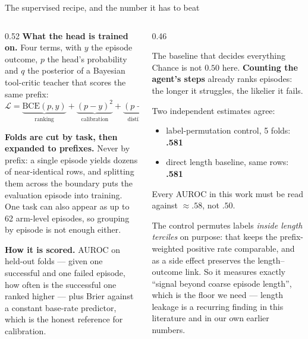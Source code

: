 \documentclass[10pt, aspectratio=169]{beamer}
\newcommand{\g}[1]{\textcolor{accent2}{\textbf{#1}}}
\newcommand{\bad}[1]{\textcolor{warn}{#1}}
\begin{document}
\begin{frame}{The supervised recipe, and the number it has to beat}
\footnotesize
\begin{columns}[t]
\begin{column}{0.52\textwidth}
\textbf{What the head is trained on.} Four terms, with $y$ the episode outcome,
$p$ the head's probability and $q$ the posterior of a Bayesian tool-critic
teacher that scores the same prefix:
\[\textstyle
\mathcal{L}=\underbrace{\mathrm{BCE}(p,y)}_{\text{ranking}}
+\underbrace{(p-y)^2}_{\text{calibration}}
+\underbrace{(p-q)^2}_{\text{distillation}}
+0.3\,\underbrace{\mathcal{L}_{\text{struct}}}_{\text{repeat/stall flags}}
\]

\medskip
\textbf{Folds are cut by task, then expanded to prefixes.} Never by prefix: a
single episode yields dozens of near-identical rows, and splitting them across
the boundary puts the evaluation episode into training. One task can also
appear as up to 62 arm-level episodes, so grouping by episode is not enough
either.

\medskip
\textbf{How it is scored.} AUROC on held-out folds --- given one successful and
one failed episode, how often is the successful one ranked higher --- plus
Brier against a constant base-rate predictor, which is the honest reference for
calibration.
\end{column}
\begin{column}{0.46\textwidth}
\begin{block}{The baseline that decides everything}
Chance is not $0.50$ here. \textbf{Counting the agent's steps} already ranks
episodes: the longer it struggles, the likelier it fails.

\medskip
Two independent estimates agree:
\begin{itemize}\itemsep1pt
  \item label-permutation control, 5 folds: \g{.581}
  \item direct length baseline, same rows: \g{.581}
\end{itemize}

\medskip
\bad{Every AUROC in this work must be read against $\approx.58$, not $.50$.}
\end{block}

\smallskip
The control permutes labels \emph{inside length terciles} on purpose: that
keeps the prefix-weighted positive rate comparable, and as a side effect
preserves the length--outcome link. So it measures exactly ``signal beyond
coarse episode length'', which is the floor we need --- length leakage is a
recurring finding in this literature and in our own earlier numbers.
\end{column}
\end{columns}
\end{frame}
\end{document}
